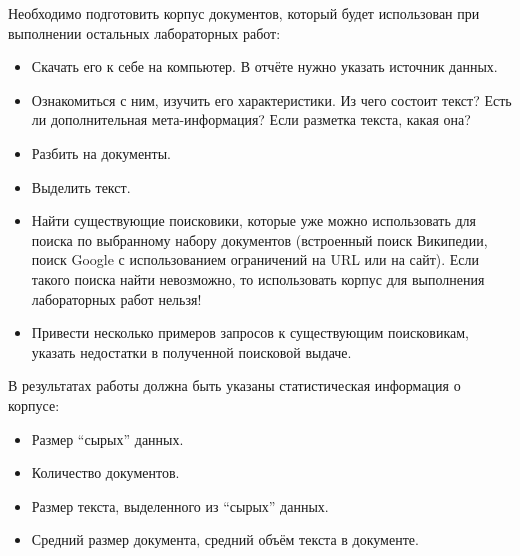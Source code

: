 
Необходимо подготовить корпус документов, который будет использован при выполнении остальных лабораторных работ:
\begin{itemize}
    \item Скачать его к себе на компьютер. В отчёте нужно указать источник данных.
    \item Ознакомиться с ним, изучить его характеристики. Из чего состоит текст? Есть ли
дополнительная мета-информация? Если разметка текста, какая она?
    \item Разбить на документы.
    \item Выделить текст.
    \item Найти существующие поисковики, которые уже можно использовать для поиска по
выбранному набору документов (встроенный поиск Википедии, поиск Google с использованием ограничений на URL или на сайт). Если такого поиска найти невозможно, то использовать корпус для выполнения лабораторных работ нельзя!
    \item Привести несколько примеров запросов к существующим поисковикам, указать недостатки в полученной поисковой выдаче.
\end{itemize}

В результатах работы должна быть указаны статистическая информация о корпусе:
\begin{itemize}
    \item Размер \enquote{сырых} данных.
    \item Количество документов.
    \item Размер текста, выделенного из \enquote{сырых} данных.
    \item Средний размер документа, средний объём текста в документе.
\end{itemize}

\pagebreak
